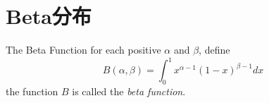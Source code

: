 \documentclass[../常见分布.tex]{subfiles}
\begin{document}
\section{Beta分布}

\begin{definition}{The Beta Function}{}
for each positive $\alpha$ and $\beta$, define
\begin{equation}\label{}
B(\alpha, \beta)=\int_{0}^{1} x^{\alpha-1}(1-x)^{\beta-1}dx
\end{equation}
the function $B$ is called the \textit{beta function}.

\end{definition}
\end{document}
